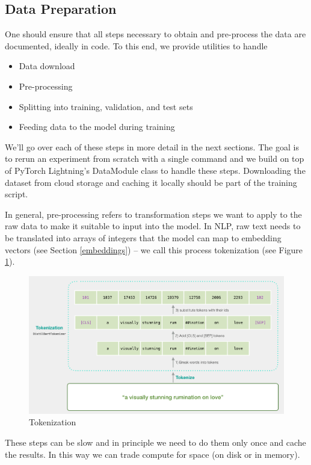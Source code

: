 \subsection{Data Preparation}
One should ensure that all steps necessary to obtain and pre-process the data are documented, ideally in code.
To this end, we provide utilities to handle
\begin{itemize}
    \item Data download
    \item Pre-processing
    \item Splitting into training, validation, and test sets
    \item Feeding data to the model during training
\end{itemize}

We'll go over each of these steps in more detail in the next sections.
The goal is to rerun an experiment from scratch with a single command and we build on top of PyTorch Lightning's DataModule class to handle these steps.
Downloading the dataset from cloud storage and caching it locally should be part of the training script.


In general, pre-processing refers to transformation steps we want to apply to the raw data to make it suitable to input into the model.
In NLP, raw text needs to be translated into arrays of integers that the model can map to embedding vectors (see Section \ref{embeddings}) -- we call this process tokenization (see Figure \ref{fig:tokenization}).
\begin{figure}
    \includegraphics[width=\linewidth]{chapters/NLP/figures/tokenization.png}
    \caption{Tokenization}
    \label{fig:tokenization}
\end{figure}
These steps can be slow and in principle we need to do them only once and cache the results.
In this way we can trade compute for space (on disk or in memory).


